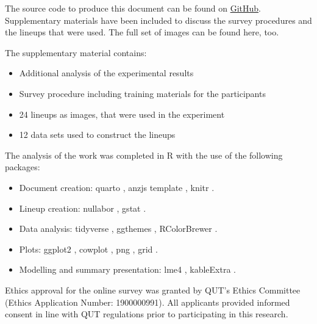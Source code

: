 \documentclass[
doublespace,
  times]{anzsauth}
\providecommand{\tightlist}{%
  \setlength{\itemsep}{0pt}\setlength{\parskip}{0pt}}
\begin{document}
The source code to produce this document can be found on
\href{https://github.com/srkobakian/experiment/paper}{GitHub}.
Supplementary materials have been included to discuss the survey
procedures and the lineups that were used. The full set of images can be
found here, too.

The supplementary material contains:

\begin{itemize}
\tightlist
\item
  Additional analysis of the experimental results
\item
  Survey procedure including training materials for the participants
\item
  24 lineups as images, that were used in the experiment
\item
  12 data sets used to construct the lineups
\end{itemize}

The analysis of the work was completed in R \citep{RCore} with the use
of the following packages:

\begin{itemize}
\tightlist
\item
  Document creation: quarto \citep{Allaire_Quarto_2025}, anzjs template
  \citep{quarto-anzjs}, knitr \citep{knitr}.
\item
  Lineup creation: nullabor \citep{nullabor}, gstat \citep{gstat}.
\item
  Data analysis: tidyverse \citep{tidyverse}, ggthemes \citep{ggthemes},
  RColorBrewer \citep{RColorBrewer}.
\item
  Plots: ggplot2 \citep{ggplot2}, cowplot \citep{cowplot}, png
  \citep{png}, grid \citep{grid}.
\item
  Modelling and summary presentation: lme4 \citep{lme4}, kableExtra
  \citep{kableExtra}.
\end{itemize}

Ethics approval for the online survey was granted by QUT's Ethics
Committee (Ethics Application Number: 1900000991). All applicants
provided informed consent in line with QUT regulations prior to
participating in this research.



\end{document}
